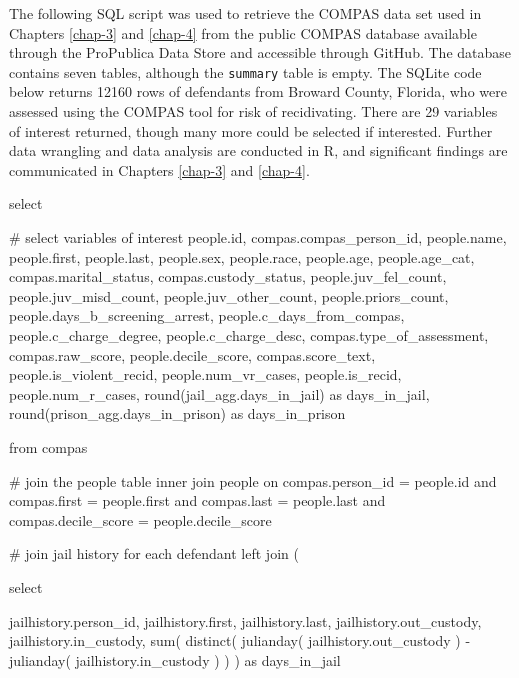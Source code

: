 \documentclass[12pt, twoside]{amherstthesis}
\newenvironment{Shaded}{\begin{snugshade}}{\end{snugshade}}
\newcommand{\NormalTok}[1]{#1}
\begin{document}
\noindent The following SQL script was used to retrieve the COMPAS data set used in Chapters \ref{chap-3} and \ref{chap-4} from the public COMPAS database available through the ProPublica Data Store and accessible through GitHub. The database contains seven tables, although the \texttt{summary} table is empty. The SQLite code below returns 12160 rows of defendants from Broward County, Florida, who were assessed using the COMPAS tool for risk of recidivating. There are 29 variables of interest returned, though many more could be selected if interested.
Further data wrangling and data analysis are conducted in R, and significant findings are communicated in Chapters \ref{chap-3} and \ref{chap-4}.
\begin{Shaded}
\begin{Highlighting}[]
\NormalTok{select }

\NormalTok{\# select variables of interest }
\NormalTok{people.id,}
\NormalTok{compas.compas\_person\_id,}
\NormalTok{people.name,}
\NormalTok{people.first,}
\NormalTok{people.last,}
\NormalTok{people.sex,}
\NormalTok{people.race, }
\NormalTok{people.age,}
\NormalTok{people.age\_cat,}
\NormalTok{compas.marital\_status,}
\NormalTok{compas.custody\_status,}
\NormalTok{people.juv\_fel\_count,}
\NormalTok{people.juv\_misd\_count,}
\NormalTok{people.juv\_other\_count,}
\NormalTok{people.priors\_count,}
\NormalTok{people.days\_b\_screening\_arrest,}
\NormalTok{people.c\_days\_from\_compas,}
\NormalTok{people.c\_charge\_degree,}
\NormalTok{people.c\_charge\_desc,}
\NormalTok{compas.type\_of\_assessment,}
\NormalTok{compas.raw\_score,}
\NormalTok{people.decile\_score,}
\NormalTok{compas.score\_text,}
\NormalTok{people.is\_violent\_recid,}
\NormalTok{people.num\_vr\_cases,}
\NormalTok{people.is\_recid,}
\NormalTok{people.num\_r\_cases,}
\NormalTok{round(jail\_agg.days\_in\_jail) as days\_in\_jail,}
\NormalTok{round(prison\_agg.days\_in\_prison) as days\_in\_prison}

\NormalTok{from compas}

\NormalTok{\# join the \textquotesingle{}people\textquotesingle{} table}
\NormalTok{inner join people}
\NormalTok{on compas.person\_id = people.id}
\NormalTok{and compas.first = people.first}
\NormalTok{and compas.last = people.last}
\NormalTok{and compas.decile\_score = people.decile\_score}

\NormalTok{\# join jail history for each defendant}
\NormalTok{left join  (}

\NormalTok{select }

\NormalTok{jailhistory.person\_id,}
\NormalTok{jailhistory.first,}
\NormalTok{jailhistory.last,}
\NormalTok{jailhistory.out\_custody,}
\NormalTok{jailhistory.in\_custody,}
\NormalTok{sum(}
\NormalTok{  distinct(}
\NormalTok{    julianday(}
\NormalTok{      jailhistory.out\_custody}
\NormalTok{      ) {-} julianday(}
\NormalTok{        jailhistory.in\_custody}
\NormalTok{        )}
\NormalTok{    )}
\NormalTok{  ) as days\_in\_jail}


\end{Highlighting}
\end{Shaded}
\end{document}
